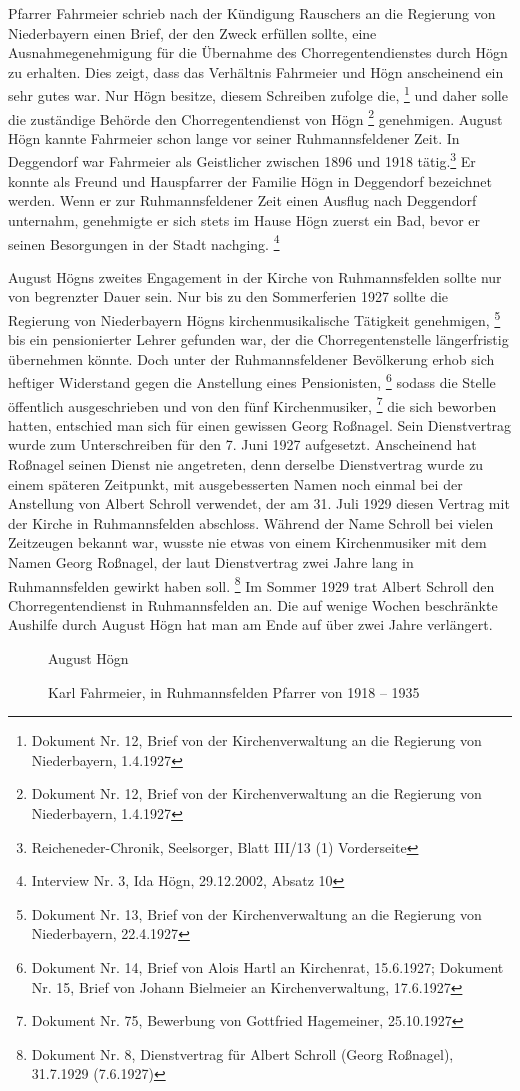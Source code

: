 Pfarrer Fahrmeier schrieb nach der Kündigung Rauschers an die Regierung
von Niederbayern einen Brief, der den Zweck erfüllen sollte, eine
Ausnahmegenehmigung für die Übernahme des Chorregentendienstes durch
Högn zu erhalten. Dies zeigt, dass das Verhältnis Fahrmeier und Högn
anscheinend ein sehr gutes war. Nur Högn besitze, diesem Schreiben
zufolge die, \footnote{
Dokument Nr. 12, Brief von der Kirchenverwaltung an die Regierung von
Niederbayern, 1.4.1927} und daher solle die zuständige Behörde den
Chorregentendienst von Högn  \footnote{Dokument Nr. 12, Brief von der Kirchenverwaltung an die
Regierung von Niederbayern, 1.4.1927} genehmigen. August Högn kannte
Fahrmeier schon lange vor seiner Ruhmannsfeldener Zeit. In Deggendorf
war Fahrmeier als Geistlicher zwischen 1896 und 1918 tätig.\footnote{
Reicheneder-Chronik, Seelsorger, Blatt III/13
(1) Vorderseite} Er konnte als Freund und Hauspfarrer der Familie Högn
in Deggendorf bezeichnet werden. Wenn er zur Ruhmannsfeldener Zeit
einen Ausflug nach Deggendorf unternahm, genehmigte er sich stets im
Hause Högn zuerst ein Bad, bevor er seinen Besorgungen in der Stadt
nachging. \footnote{Interview Nr. 3, Ida Högn, 29.12.2002, Absatz 10}

August Högns zweites Engagement in der Kirche von Ruhmannsfelden sollte
nur von begrenzter Dauer sein. Nur bis zu den Sommerferien 1927 sollte
die Regierung von Niederbayern Högns kirchenmusikalische Tätigkeit
genehmigen, \footnote{Dokument Nr. 13, Brief von der Kirchenverwaltung
an die Regierung von Niederbayern, 22.4.1927} bis ein pensionierter
Lehrer gefunden war, der die Chorregentenstelle längerfristig
übernehmen könnte. Doch unter der Ruhmannsfeldener Bevölkerung erhob
sich heftiger Widerstand gegen die Anstellung eines
Pensionisten, \footnote{Dokument Nr. 14, Brief von Alois Hartl an
Kirchenrat, 15.6.1927; Dokument Nr. 15, Brief von Johann Bielmeier an
Kirchenverwaltung, 17.6.1927} sodass die Stelle öffentlich
ausgeschrieben und von den fünf Kirchenmusiker, \footnote{Dokument Nr.
75, Bewerbung von Gottfried Hagemeiner, 25.10.1927} die sich beworben
hatten, entschied man sich für einen gewissen Georg Roßnagel. Sein
Dienstvertrag wurde zum Unterschreiben für den 7. Juni 1927 aufgesetzt.
Anscheinend hat Roßnagel seinen Dienst nie angetreten, denn derselbe
Dienstvertrag wurde zu einem späteren Zeitpunkt, mit ausgebesserten
Namen noch einmal bei der Anstellung von Albert Schroll verwendet, der
am 31. Juli 1929 diesen Vertrag mit der Kirche in Ruhmannsfelden
abschloss. Während der Name Schroll bei vielen Zeitzeugen bekannt war,
wusste nie etwas von einem Kirchenmusiker mit dem Namen Georg Roßnagel,
der laut Dienstvertrag zwei Jahre lang in Ruhmannsfelden gewirkt haben
soll. \footnote{Dokument Nr. 8, Dienstvertrag für Albert Schroll (Georg
Roßnagel), 31.7.1929 (7.6.1927)} Im Sommer 1929 trat Albert Schroll den
Chorregentendienst in Ruhmannsfelden an. Die auf wenige Wochen
beschränkte Aushilfe durch August Högn hat man am Ende auf über zwei
Jahre verlängert.

\begin{figure}
\caption{August Högn}
\end{figure}

\begin{figure}
\caption{Karl Fahrmeier, in Ruhmannsfelden
Pfarrer von 1918 – 1935}
\end{figure}